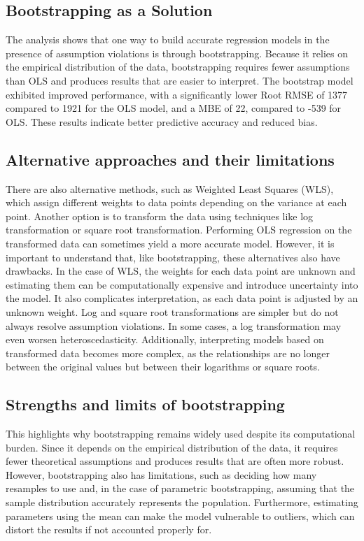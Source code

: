 \subsection{Bootstrapping as a Solution}
The analysis shows that one way to build accurate regression models in the presence of assumption violations is through bootstrapping. Because it relies on the empirical distribution of the data, bootstrapping requires fewer assumptions than OLS and produces results that are easier to interpret. The bootstrap model exhibited improved performance, with a significantly lower Root RMSE of 1377 compared to 1921 for the OLS model, and a MBE of 22, compared to -539 for OLS. These results indicate better predictive accuracy and reduced bias.

\subsection{Alternative approaches and their limitations}
There are also alternative methods, such as Weighted Least Squares (WLS), which assign different weights to data points depending on the variance at each point. Another option is to transform the data using techniques like log transformation or square root transformation. Performing OLS regression on the transformed data can sometimes yield a more accurate model. However, it is important to understand that, like bootstrapping, these alternatives also have drawbacks. In the case of WLS, the weights for each data point are unknown and estimating them can be computationally expensive and introduce uncertainty into the model. It also complicates interpretation, as each data point is adjusted by an unknown weight. Log and square root transformations are simpler but do not always resolve assumption violations. In some cases, a log transformation may even worsen heteroscedasticity. Additionally, interpreting models based on transformed data becomes more complex, as the relationships are no longer between the original values but between their logarithms or square roots.

\subsection{Strengths and limits of bootstrapping}
This highlights why bootstrapping remains widely used despite its computational burden. Since it depends on the empirical distribution of the data, it requires fewer theoretical assumptions and produces results that are often more robust. However, bootstrapping also has limitations, such as deciding how many resamples to use and, in the case of parametric bootstrapping, assuming that the sample distribution accurately represents the population. Furthermore, estimating parameters using the mean can make the model vulnerable to outliers, which can distort the results if not accounted properly for.